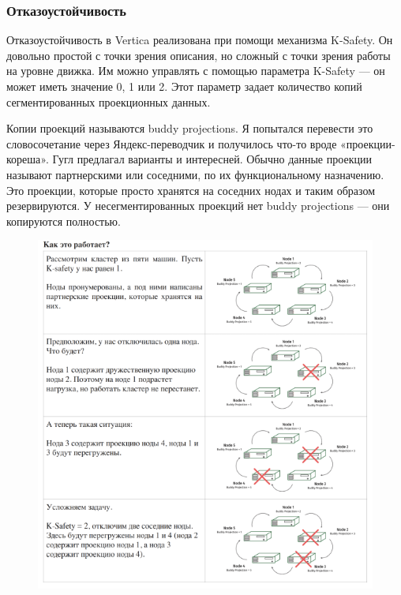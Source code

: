 \subsubsection{Отказоустойчивость}

Отказоустойчивость в Vertica реализована при помощи механизма K-Safety.
Он довольно
простой с точки зрения описания, но сложный с точки зрения работы на
уровне движка. Им можно управлять с помощью параметра K-Safety — он
может иметь значение 0, 1 или 2. Этот параметр задает количество копий
сегментированных проекционных данных.

Копии проекций называются buddy projections. Я попытался перевести это
словосочетание через Яндекс-переводчик и получилось что-то вроде
«проекции-кореша». Гугл предлагал варианты и интересней. Обычно
данные проекции называют партнерскими или соседними, по их
функциональному назначению. Это проекции, которые просто хранятся на
соседних нодах и таким образом резервируются. У несегментированных
проекций нет buddy projections — они копируются полностью.

\begin{figure}[ht!]
	\centering
	\includegraphics[width=18cm, keepaspectratio]{assets/MPP-4.png}
	\caption{} 
\end{figure}
\FloatBarrier

